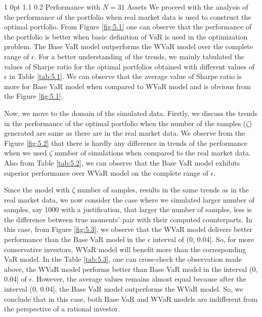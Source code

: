 \documentclass[12pt]{article}
\makeatletter
\numberwithin{equation}{section}
\renewcommand{\subsubsection}{
  \@startsection
  {subsubsection}%
  {1}%
  {0pt}%
  {1.1\baselineskip}%
  {0.2\baselineskip}%
  {\sc \centering}%
}
\makeatother
\begin{document}
\subsubsection{Performance with $N=31$ Assets}
We proceed with the analysis of the performance of the portfolio when real market data is used to construct the optimal portfolio. From Figure \ref{fig:5.1} one can observe that the performance of the portfolio is better when basic definition of VaR is used in the optimization problem. The Base VaR model outperforms the WVaR model over the complete range of $\epsilon$. For a better understanding of the trends, we mainly tabulated the values of Sharpe ratio for the optimal portfolios obtained with different values of $\epsilon$ in Table \ref{tab:5.1}. We can observe that the average value of Sharpe ratio is more for Base VaR model when compared to WVaR model and is obvious from the Figure \ref{fig:5.1}.

Now, we move to the domain of the simulated data. Firstly, we discuss the trends in the performance of the optimal portfolio when the number of the samples ($\zeta$) generated are same as there are in the real market data. We observe from the Figure \ref{fig:5.2} that there is hardly any difference in trends of the performance when we used $\zeta$ number of simulations when compared to the real market data. Also from Table \ref{tab:5.2}, we can observe that the Base VaR model exhibits superior performance over WVaR model on the complete range of $\epsilon$.

Since the model with $\zeta$ number of samples, results in the same trends as in the real market data, we now consider the case where we simulated larger number of samples, say 1000 with a justification, that larger the number of samples, less is the difference between true moments' pair with their computed counterparts. In this case, from Figure \ref{fig:5.3}, we observe that the WVaR model delivers better performance than the Base VaR model in the $\epsilon$ interval of (0, 0.04]. So, for more conservative investors, WVaR model will benefit more than the corresponding VaR model. In the Table \ref{tab:5.3}, one can cross-check the observation made above, the WVaR model performs better than Base VaR model in the interval (0, 0.04] of $\epsilon$. However, the average values remains almost equal because after the interval (0, 0.04], the Base VaR model outperforms the WVaR model. So, we conclude that in this case, both Base VaR and WVaR models are indifferent from the perspective of a rational investor.
\end{document}
